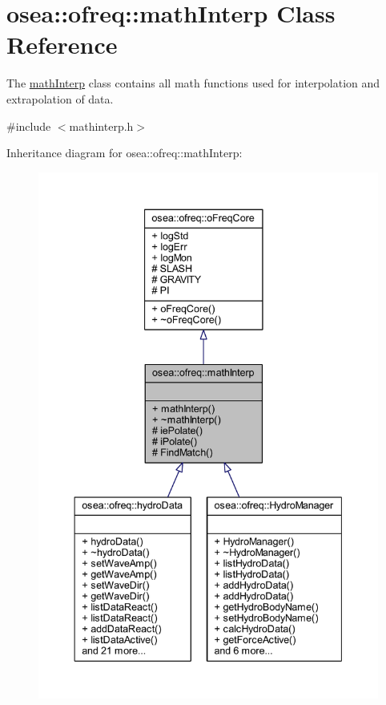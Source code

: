 \hypertarget{classosea_1_1ofreq_1_1math_interp}{\section{osea\-:\-:ofreq\-:\-:math\-Interp Class Reference}
\label{classosea_1_1ofreq_1_1math_interp}
}


The \hyperlink{classosea_1_1ofreq_1_1math_interp}{math\-Interp} class contains all math functions used for interpolation and extrapolation of data.  




{\ttfamily \#include $<$mathinterp.\-h$>$}



Inheritance diagram for osea\-:\-:ofreq\-:\-:math\-Interp\-:
\nopagebreak
\begin{figure}[H]
\begin{center}
\leavevmode
\includegraphics[width=350pt]{classosea_1_1ofreq_1_1math_interp__inherit__graph}
\end{center}
\end{figure}
